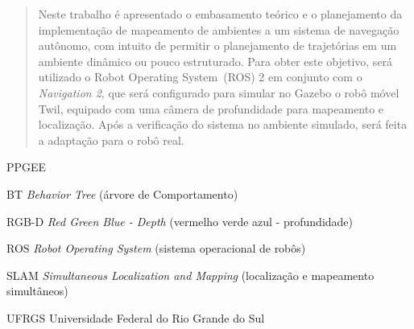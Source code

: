 \documentclass[repeatfields,xlists,xpacks,oneside,yearsonly]{ufrgscca}
\begin{document}
\maketitle




\begin{abstract}

    Neste trabalho é apresentado o embasamento teórico e o planejamento
    da implementação de mapeamento de ambientes a um sistema de navegação
    autônomo, com intuito de permitir o planejamento de trajetórias em um
    ambiente dinâmico ou pouco estruturado. Para obter este objetivo,
    será utilizado o Robot Operating System~(ROS) 2 em conjunto com o
    \textit{Navigation 2}, que será configurado para simular no Gazebo o
    robô móvel Twil, equipado com uma câmera de profundidade para
    mapeamento e localização. Após a verificação do sistema no ambiente
    simulado, será feita a adaptação para o robô real.
\end{abstract}



\setcounter{tocdepth}{3}

\listoffigures

\listoftables

\begin{listofabbrv}{PPGEE}
    \item[BT] \textit{Behavior Tree} (árvore de Comportamento)
    \item[RGB-D] \textit{Red Green Blue - Depth} (vermelho verde azul -
    profundidade)
    \item[ROS] \textit{Robot Operating System} (sistema operacional de robôs)
    \item[SLAM] \textit{Simultaneous Localization and Mapping} (localização e
    mapeamento simultâneos)
    \item[UFRGS] Universidade Federal do Rio Grande do Sul
\end{listofabbrv}
\end{document}
